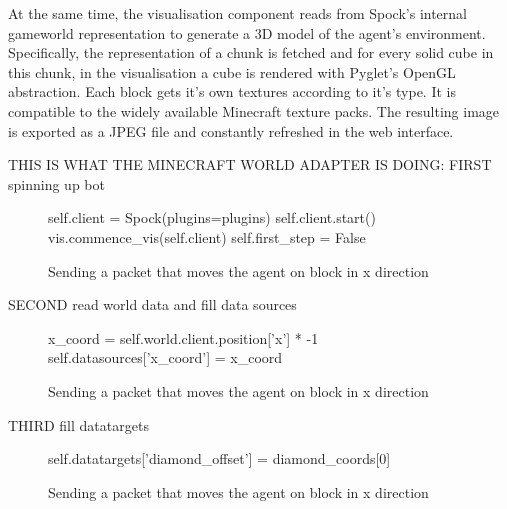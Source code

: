 At the same time, the visualisation component reads from Spock's internal gameworld representation to generate a 3D model of the agent's environment. Specifically, the representation of a chunk is fetched and for every solid cube in this chunk, in the visualisation a cube is rendered with Pyglet's OpenGL abstraction. Each block gets it's own textures according to it's type. It is compatible to the widely available Minecraft texture packs. The resulting image is exported as a JPEG file and constantly refreshed in the web interface.

THIS IS WHAT THE MINECRAFT WORLD ADAPTER IS DOING:
FIRST spinning up bot

\begin{figure}[ht]
			\centering
			\begin{minipage}{11cm}
				\begin{pseudocode}
			self.client = Spock(plugins=plugins)
            self.client.start()
            vis.commence_vis(self.client)
            self.first_step = False
				\end{pseudocode}
				\caption{Sending a packet that moves the agent on block in x direction}
				\label{snippet_position-packet}
			\end{minipage}
		\end{figure}
		
SECOND read world data and fill data sources

\begin{figure}[ht]
			\centering
			\begin{minipage}{11cm}
				\begin{pseudocode}
			x_coord = self.world.client.position['x'] * -1
			self.datasources['x_coord'] = x_coord
				\end{pseudocode}
				\caption{Sending a packet that moves the agent on block in x direction}
				\label{snippet_position-packet}
			\end{minipage}
		\end{figure}

THIRD fill datatargets

\begin{figure}[ht]
			\centering
			\begin{minipage}{11cm}
				\begin{pseudocode}
self.datatargets['diamond_offset'] = diamond_coords[0]
				\end{pseudocode}
				\caption{Sending a packet that moves the agent on block in x direction}
				\label{snippet_position-packet}
			\end{minipage}
		\end{figure}
		
